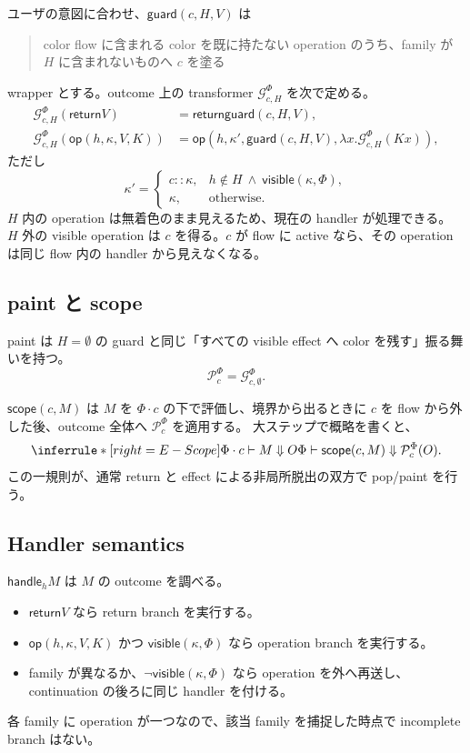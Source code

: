 \documentclass[uplatex,dvipdfmx,a4paper,11pt]{jsarticle}
\theoremstyle{jpplain}
\newcommand{\flow}{\Phi}
\newcommand{\colors}{\kappa}
\newcommand{\visible}{\mathsf{visible}}
\newcommand{\Guard}{\mathcal G}
\newcommand{\Paint}{\mathcal P}
\newcommand{\ret}{\mathsf{return}}
\newcommand{\oper}{\mathsf{op}}
\newcommand{\scope}{\mathsf{scope}}
\newcommand{\guard}{\mathsf{guard}}
\newcommand{\handle}{\mathsf{handle}}
\begin{document}
ユーザの意図に合わせ、$\guard(c,H,V)$ は
\begin{quote}
color flow に含まれる color を既に持たない operation のうち、family が $H$ に含まれないものへ $c$ を塗る
\end{quote}
wrapper とする。outcome 上の transformer $\Guard_{c,H}^{\flow}$ を次で定める。
\[
\begin{aligned}
 \Guard_{c,H}^{\flow}(\ret V)
   &= \ret\guard(c,H,V),\\
 \Guard_{c,H}^{\flow}(\oper(h,\colors,V,K))
   &= \oper(h,\colors',\guard(c,H,V),
      \lambda x.\Guard_{c,H}^{\flow}(Kx)),
\end{aligned}
\]
ただし
\[
 \colors'=
 \begin{cases}
   c::\colors,
     & h\notin H\ \land\ \visible(\colors,\flow),\\
   \colors,&\text{otherwise}.
 \end{cases}
\]
$H$ 内の operation は無着色のまま見えるため、現在の handler が処理できる。
$H$ 外の visible operation は $c$ を得る。$c$ が flow に active なら、その operation は同じ flow 内の handler から見えなくなる。

\subsection{paint と scope}

paint は $H=\emptyset$ の guard と同じ「すべての visible effect へ color を残す」振る舞いを持つ。
\[
  \Paint_c^{\flow}=\Guard_{c,\emptyset}^{\flow}.
\]

$\scope(c,M)$ は $M$ を $\flow\cdot c$ の下で評価し、境界から出るときに $c$ を flow から外した後、outcome 全体へ $\Paint_c^{\flow}$ を適用する。
大ステップで概略を書くと、
\[
\inferrule*[right=E-Scope]
 {\flow\cdot c\vdash M\Downarrow O}
 {\flow\vdash \scope(c,M)\Downarrow \Paint_c^{\flow}(O)}.
\]
この一規則が、通常 return と effect による非局所脱出の双方で pop/paint を行う。

\subsection{Handler semantics}

$\handle_h M$ は $M$ の outcome を調べる。
\begin{itemize}
  \item $\ret V$ なら return branch を実行する。
  \item $\oper(h,\colors,V,K)$ かつ $\visible(\colors,\flow)$ なら operation branch を実行する。
  \item family が異なるか、$\neg\visible(\colors,\flow)$ なら operation を外へ再送し、continuation の後ろに同じ handler を付ける。
\end{itemize}
各 family に operation が一つなので、該当 family を捕捉した時点で incomplete branch はない。
\end{document}
